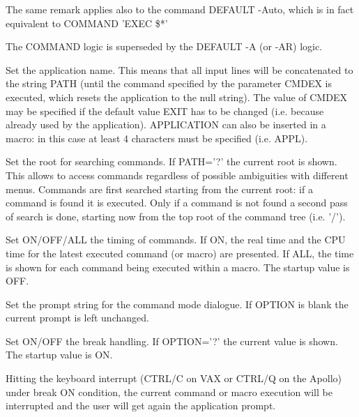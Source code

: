 The same remark applies also to the command DEFAULT -Auto,
which is in fact equivalent to COMMAND 'EXEC \$*'

The COMMAND logic is superseded by the DEFAULT -A (or -AR) logic.
\ENDTEXT

\BEGARG
{}
\ENDARG
\BEGTEXT
Set the application name.
This means that all input lines will be concatenated to the string PATH
(until the command specified by the parameter CMDEX is executed,
which resets the application to the null string). The value of CMDEX
may be specified if the default value EXIT has to be changed
(i.e. because already used by the application).
APPLICATION can also be inserted in a macro: in this case at least
4 characters must be specified (i.e. APPL).
\ENDTEXT

\BEGARG
{}
\ENDARG
\BEGTEXT
Set the root for searching commands.
If PATH='?' the current root is shown.
This allows to access commands regardless of possible
ambiguities with different menus.
Commands are first searched starting from the current root:
if a command is found it is executed.
Only if a command is not found a second pass of search is done,
starting now from the top root of the command tree (i.e. '/').
\ENDTEXT

\BEGARG
{}
\ENDARG
\BEGTEXT
Set ON/OFF/ALL the timing of commands.
If ON, the real time and the CPU time for the latest
executed command (or macro) are presented.
If ALL, the time is shown for each command being executed within a macro.
The startup value is OFF.
\ENDTEXT

\BEGARG
{}
\ENDARG
\BEGTEXT
Set the prompt string for the command mode dialogue.
If OPTION is blank the current prompt is left unchanged.
\ENDTEXT

\BEGARG
{}
\ENDARG
\BEGTEXT
Set ON/OFF the break handling.
If OPTION='?' the current value is shown.
The startup value is ON.

Hitting the keyboard interrupt (CTRL/C on VAX or CTRL/Q on the Apollo)
under break ON condition, the current command or macro execution
will be interrupted and the user will get again the application prompt.

